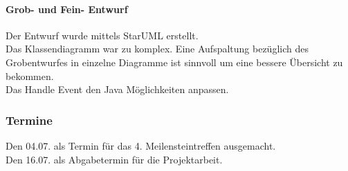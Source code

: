 \paragraph{Grob- und Fein- Entwurf}
Der Entwurf wurde mittels StarUML erstellt.
\\Das Klassendiagramm war zu komplex. Eine Aufspaltung bezüglich des Grobentwurfes in einzelne Diagramme ist sinnvoll um eine bessere Übersicht zu bekommen. 
\\Das Handle Event den Java Möglichkeiten anpassen.

\subsubsection{Termine}

Den 04.07. als Termin für das 4. Meilensteintreffen ausgemacht.
\\Den 16.07. als Abgabetermin für die Projektarbeit.